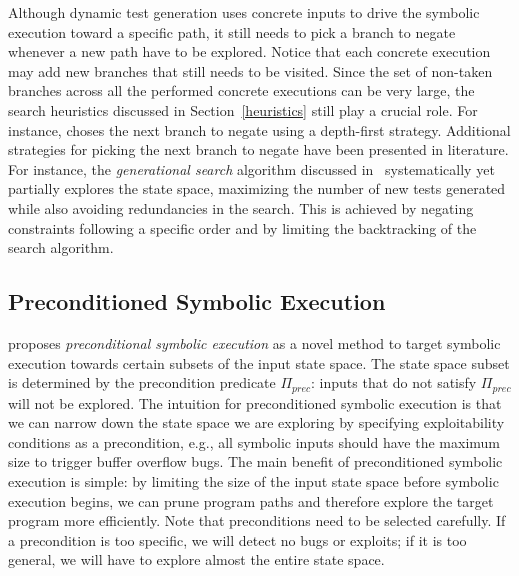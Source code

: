 Although dynamic test generation uses concrete inputs to drive the symbolic execution toward a specific path, it still needs to pick a branch to negate whenever a new path have to be explored. Notice that each concrete execution may add new branches that still needs to be visited. Since the set of non-taken branches across all the performed concrete executions can be very large, the search heuristics discussed in Section~\ref{heuristics} still play a crucial role. For instance, \cite{DART-PLDI05} choses the next branch to negate using a depth-first strategy. Additional strategies for picking the next branch to negate have been presented in literature. For instance, the {\em generational search} algorithm discussed in~\cite{SAGE-NDSS08} systematically yet partially explores the state space, maximizing the number of new tests generated while also avoiding redundancies in the search. This is achieved by negating constraints following a specific order and by limiting the backtracking of the search algorithm.




\subsection{Preconditioned Symbolic Execution}
\label{precontioned-symbolic-execution}

\cite{AEG-NDSS11} proposes {\em preconditional symbolic execution} as a novel method to target symbolic execution towards certain subsets of the input state space. The state space subset is determined by the precondition predicate $\Pi_{prec}$: inputs that do not satisfy $\Pi_{prec}$ will not be explored. The intuition for preconditioned symbolic execution is that we can narrow down the state space we are exploring by specifying exploitability conditions as a precondition, e.g., all symbolic inputs should have the maximum size to trigger buffer overflow bugs. The main benefit of preconditioned symbolic execution is simple: by limiting the size of the input state space before symbolic execution begins, we can prune program paths and therefore explore the target program more efficiently.
Note that preconditions need to be selected carefully. If a precondition is too specific, we will detect no bugs or exploits; if it is too general, we will have to explore almost the entire state space. %

